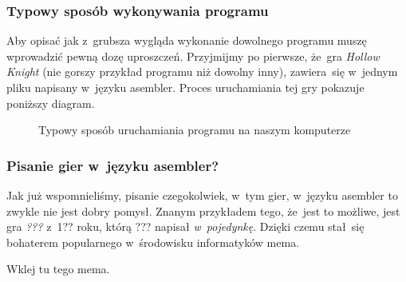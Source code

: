 \documentclass[10pt,t]{beamer}
\begin{document}
\begin{frame}
  \frametitle{Typowy sposób wykonywania programu}


  Aby opisać jak z~grubsza wygląda wykonanie dowolnego programu muszę
  wprowadzić pewną dozę uproszczeń. Przyjmijmy po pierwsze, że~gra
  \textit{Hollow Knight} (nie gorszy przykład programu niż dowolny inny),
  zawiera~się w~jednym pliku napisany w~języku asembler. Proces
  uruchamiania tej gry pokazuje poniższy diagram.





  \begin{figure}

    \label{fig:Running-Hollow-Knight-bad}


    \caption{Typowy sposób uruchamiania programu na naszym komputerze}


  \end{figure}

\end{frame}





\begin{frame}
  \frametitle{Pisanie gier w~języku asembler?}


  Jak już wspomnieliśmy, pisanie czegokolwiek, w~tym gier, w~języku
  asembler to zwykle nie jest dobry pomysł. Znanym przykładem tego, że~jest
  to możliwe, jest gra \textit{???} z~1?? roku, którą ??? napisał
  \textit{w~pojedynkę}. Dzięki czemu stał~się bohaterem popularnego
  w~środowisku informatyków mema.

  Wklej tu tego mema.

\end{frame}
\end{document}
